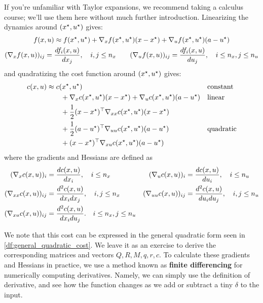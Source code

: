 \documentclass[../main/main]{subfiles}
\begin{document}

If you're unfamiliar with Taylor expansions, we recommend taking a calculus course; we'll use them here without much further introduction. Linearizing the dynamics around $(x^\star, u^\star)$ gives:
\begin{gather*}
    f(x, u) \approx f(x^\star, u^\star) + \nabla_x f(x^\star, u^\star) (x - x^\star) + \nabla_u f(x^\star, u^\star) (a - u^\star) \\
    (\nabla_x f(x, u))_{ij} = \frac{d f_i(x, u)}{d x_j}, \quad i, j \le n_x \qquad (\nabla_u f(x, u))_{ij} = \frac{d f_i(x, u)}{d u_j}, \quad i \le n_x, j \le n_u
\end{gather*}
and quadratizing the cost function around $(x^\star, u^\star)$ gives:
\begin{align*}
    c(x, u) &\approx c(x^\star, u^\star) && \text{constant} \\
    &\qquad + \nabla_x c(x^\star, u^\star) (x - x^\star) + \nabla_u c(x^\star, u^\star) (a - u^\star) && \text{linear} \\
    &\qquad + \frac{1}{2} (x - x^\star)^\top \nabla_{x x} c(x^\star, u^\star) (x - x^\star) \\
    &\qquad + \frac{1}{2} (a - u^\star)^\top \nabla_{u u} c(x^\star, u^\star) (a - u^\star) && \text{quadratic} \\
    &\qquad + (x - x^\star)^\top \nabla_{x u} c(x^\star, u^\star) (a - u^\star)
\end{align*}
where the gradients and Hessians are defined as
\begin{align*}
    (\nabla_x c(x, u))_{i} &= \frac{d c(x, u)}{d x_i}, \quad i \le n_x
    & (\nabla_u c(x, u))_{i} &= \frac{d c(x, u)}{d u_i}, \quad i \le n_u \\
    (\nabla_{x x} c(x, u))_{ij} &= \frac{d^2 c(x, u)}{d x_i d x_j}, \quad i, j \le n_x
    & (\nabla_{u u} c(x, u))_{ij} &= \frac{d^2 c(x, u)}{d u_i d u_j}, \quad i, j \le n_u \\
    (\nabla_{x u} c(x, u))_{ij} &= \frac{d^2 c(x, u)}{d x_i d u_j}. \quad i \le n_x, j \le n_u
\end{align*}

We note that this cost can be expressed in the general quadratic form seen in \autoref{df:general_quadratic_cost}.
We leave it as an exercise to derive the corresponding matrices and vectors $Q, R, M, q, r, c$.
To calculate these gradients and Hessians in practice, we use a method known as \textbf{finite differencing} for numerically computing derivatives.
Namely, we can simply use the definition of derivative, and see how the function changes as we add or subtract a tiny $\delta$ to the input.
\end{document}
